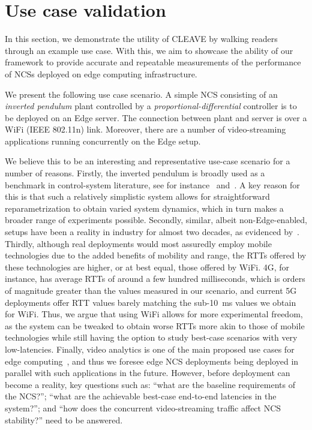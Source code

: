\section{Use case validation}\label{sec:experiments}

In this section, we demonstrate the utility of \ac{CLEAVE} by walking readers through an example use case.
With this, we aim to showcase the ability of our framework to provide accurate and repeatable measurements of the performance of \acp{NCS} deployed on edge computing infrastructure.

We present the following use case scenario.
A simple \ac{NCS} consisting of an \emph{inverted pendulum} plant controlled by a \emph{proportional-differential} controller is to be deployed on an Edge server.
The connection between plant and server is over a WiFi (IEEE 802.11n) link.
Moreover, there are a number of video-streaming applications running concurrently on the Edge setup.

We believe this to be an interesting and representative use-case scenario for a number of reasons.
Firstly, the inverted pendulum is broadly used as a benchmark in control-system literature, see for instance\ \cite{Baumann2018LowPower} and\ \cite{Natale2004InvPendEthernet}.
A key reason for this is that such a relatively simplistic system allows for straightforward reparametrization to obtain varied system dynamics, which in turn makes a broader range of experiments possible.
Secondly, similar, albeit non-Edge-enabled, setups have been a reality in industry for almost two decades, as evidenced by\ \cite{Gupta2010NCSOverview}.
Thirdly, although real deployments would most assuredly employ mobile technologies due to the added benefits of mobility and range, the \acp{RTT} offered by these technologies are higher, or at best equal, those offered by WiFi.
4G, for instance, has average \acp{RTT} of around a few hundred milliseconds, which is orders of magnitude greater than the values measured in our scenario, and current 5G deployments offer \ac{RTT} values barely matching the sub-\SI{10}{\milli\second} values we obtain for WiFi.
Thus, we argue that using WiFi allows for more experimental freedom, as the system can be tweaked to obtain worse \acp{RTT} more akin to those of mobile technologies while still having the option to study best-case scenarios with very low-latencies.
Finally, video analytics is one of the main proposed use cases for edge computing~\cite{Ananthanarayanan2017Analytics,Yi2017Analytics,Wang2018Analytics}, and thus we foresee edge \ac{NCS} deployments being deployed in parallel with such applications in the future.
However, before deployment can become a reality, key questions such as: 
``what are the baseline requirements of the \ac{NCS}?''; ``what are the achievable best-case end-to-end latencies in the system?''; and
``how does the concurrent video-streaming traffic affect \ac{NCS} stability?'' need to be answered.

